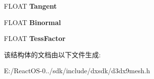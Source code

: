 \begin{DoxyCompactItemize}
F\+L\+O\+AT {\bfseries Tangent}
\item 
\mbox{\label{struct___d3_d_x_w_e_l_d_e_p_s_i_l_o_n_s_a7e947b40629fda56c80df9aa81113a92}} 
F\+L\+O\+AT {\bfseries Binormal}
\item 
\mbox{\label{struct___d3_d_x_w_e_l_d_e_p_s_i_l_o_n_s_a56ec10ea3eda28b20b5a1bf941ac5c37}} 
F\+L\+O\+AT {\bfseries Tess\+Factor}
\end{DoxyCompactItemize}


该结构体的文档由以下文件生成\+:\begin{DoxyCompactItemize}
\item 
E\+:/\+React\+O\+S-\/0../sdk/include/dxsdk/d3dx9mesh.\+h\end{DoxyCompactItemize}
